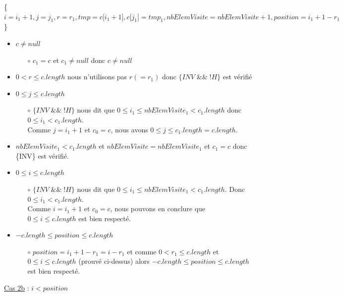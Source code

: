 	\mbox{\{$i = i_1 + 1, j=j_1,r = r_1, tmp = c{[}i_1+1{]},c{[}j_1{]} = tmp_1, nbElemVisite=nbElemVisite + 1, position=i_1 + 1 -r_1$\}}\\
	\newpage
		\begin{itemize}
			\item $c \neq null$
			\begin{itemize}
				\item[$\circ$] $c_1=c$ et $c_1 \neq null$ donc $c \neq null$
			\end{itemize}
			\item $0<r \leq c.length$ nous n’utilisons pas $r(=r_1)$  donc $\{INV \;\&\&\; !H\}$ est vérifié
			\item $0 \leq j \leq c.length$  
			\begin{itemize}
				\item[$\circ$] $\{INV\; \&\&\; !H\}$ nous dit que $0 \leq i_1 \leq nbElemVisite_1 < c_1.length$ donc $0 \leq i_1 < c_1.length$.\\ Comme $j=i_1+1$ et $c_0=c$, nous avons $0 \leq j \leq c_1.length=c.length$.
			\end{itemize}	
			\item $nbElemVisite_1<c_1.length$ et $nbElemVisite = nbElemVisite_1$ et $c_1= c$ donc \{INV\} est vérifié.   
			\item $0 \leq i \leq c.length$
			\begin{itemize}
				\item[$\circ$] $\{INV\; \&\&\; !H\}$ nous dit que $0 \leq i_1 \leq nbElemVisite_1 < c_1.length$. Donc $0 \leq i_1 < c_1.length$.\\ Comme $i=i_1+1$ et $c_0=c$, nous pouvons en conclure que $0 \leq i \leq c.length$ est bien respecté.
			\end{itemize}
			\item $-c.length \leq position \leq c.length$ 		
			\begin{itemize}
				\item[$\circ$] $position=i_1+1-r_1=i-r_1$ et comme $0<r_1 \leq c.length$ et $0 \leq i \leq c.length$ (prouvé ci-dessus) alors $-c.length \leq position \leq c.length$ est bien respecté.
			\end{itemize}				
		\end{itemize}					
		
	\begin{description}
		\item \underline{Cas 2b} : $i < position$		
	\end{description}	
	
